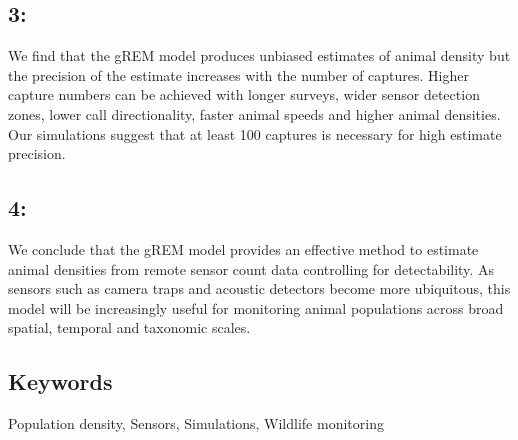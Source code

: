 \documentclass[a4paper,10pt,reqno,oneside]{amsart}
\begin{document}
\subsection*{3:} We find that the gREM model produces unbiased estimates of animal density but the precision of the estimate increases with the number of captures. Higher capture numbers can be achieved with longer surveys, wider sensor detection zones, lower call directionality, faster animal speeds and higher animal densities. Our simulations suggest that at least 100 captures is necessary for high estimate precision. %

\subsection*{4:} We conclude that the gREM model provides an effective method to estimate animal densities from remote sensor count data controlling for detectability. As sensors such as camera traps and acoustic detectors become more ubiquitous, this model will be increasingly useful for monitoring animal populations across broad spatial, temporal and taxonomic scales.  %

\subsection{Keywords} %
 Population density, Sensors, Simulations, Wildlife monitoring %
\end{document}
